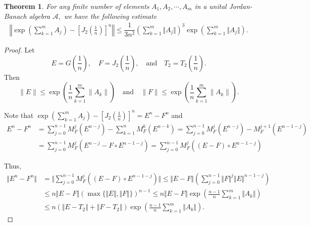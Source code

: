 \documentclass{article}
\theoremstyle{plain} %
\newtheorem{thm}{Theorem}[section]
\numberwithin{equation}{section}
\begin{document}
\begin{thm} \label{thm:Trotter:first:JordanBanach}
For any finite number of elements $A_1, A_2,\cdots, A_m$ in a unital Jordan-Banach algebra $\mathcal{A},$ we have the following estimate 
\begin{align}\label{ineq:Trotter:first:JordanBanach}
    		\left\Vert \exp \left( \sum_{k=1}^m A_j\right)-\left[J_2\left(\frac{1}{n}\right)\right]^n\right \Vert	
    		\leq
    		\dfrac{1}{3n^2}\left( \sum_{k=1}^m \Vert A_j\Vert\right)^3\exp\left(\sum_{k=1}^m {\Vert A_j\Vert}\right).	
    \end{align} 	
\end{thm}
\begin{proof}
Let 
\[
E = G\left(\frac{1}{n} \right), \quad F = J_2\left(\frac{1}{n}\right),\quad \mbox{and} \quad T_2=T_2\left(\frac{1}{n}\right) .
\]
Then
\[
\|E\| \leq \exp\left(\frac{1}{n} \sum_{k=1}^m \|A_k\|\right) \quad \text{and} \quad \|F\| \leq \exp\left(\frac{1}{n} \sum_{k=1}^m \|A_k\|\right).
\]

Note that $\displaystyle \exp \left( \sum_{k=1}^m A_j\right)-\left[J_2\left(\frac{1}{n}\right)\right]^n=E^n-F^n$ and
\begin{align}
 E^n-F^n &=\sum_{j=0}^{n-1}M_F^j(E^{n-j})-\sum_{k=1}^nM_F^k(E^{n-k})=\sum_{j=0}^{n-1}M_F^j(E^{n-j})-M_F^{j+1}(E^{n-1-j}) \nonumber\\
 &=\sum_{j=0}^{n-1}M_F^j(E^{n-j}-F\circ E^{n-1-j})=\sum_{j=0}^{n-1}M_F^j\left((E-F)\circ E^{n-1-j}\right)\nonumber
\end{align}

Thus, 
\begin{align}
\Vert E^n-F^n\Vert&=\Vert \sum_{j=0}^{n-1}M_F^j\left((E-F)\circ E^{n-1-j}\right) \Vert  \leq \Vert E-F\Vert\left(\sum_{j=0}^{n-1}\Vert F\Vert^j \Vert E \Vert^{n-1-j}\right) \nonumber\\
 &\leq n \Vert E-F\Vert\left(\max\{\Vert E\Vert, \Vert F\Vert \}\right)^{n-1}\leq n \Vert E-F\Vert\exp\left(\frac{n-1}{n}\sum_{k=1}^m \Vert A_k\Vert\right) \nonumber\\
& \leq n \left(\left\Vert E-T_2\right\Vert+\left\Vert F-T_2\right \Vert\right )\exp\left(\frac{n-1}{n}\sum_{k=1}^m \Vert A_k\Vert\right). \label{ineq:En-Fn:error}
\end{align}

\end{proof}
\end{document}
